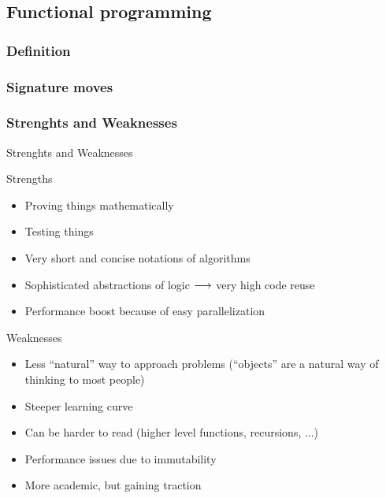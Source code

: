\subsection[Functional]{Functional programming}

\subsubsection{Definition}

\subsubsection{Signature moves}

\subsubsection{Strenghts and Weaknesses}

\begin{frame}{Strenghts and Weaknesses}
\begin{block}{Strengths}
	\begin{itemize}
		\item Proving things mathematically
		\item Testing things
		\item Very short and concise notations of algorithms
		\item Sophisticated abstractions of logic $\longrightarrow$ very high code reuse
		\item Performance boost because of easy parallelization
	\end{itemize}
\end{block}

\begin{block}{Weaknesses}
	\begin{itemize}
		\item Less \enquote{natural} way to approach problems (\enquote{objects} are a natural way of thinking to most people)
		\item Steeper learning curve
		\item Can be harder to read (higher level functions, recursions, ...)
		\item Performance issues due to immutability
		\item More academic, but gaining traction 
	\end{itemize}
\end{block}

\end{frame}